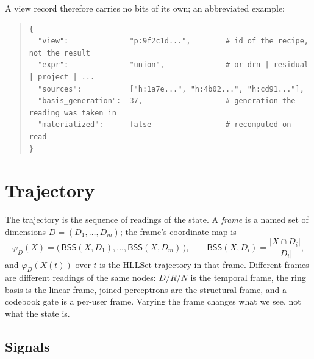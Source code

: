 \documentclass[11pt,a4paper]{article}
\theoremstyle{remark}
\newcommand{\BSS}{\ensuremath{\mathsf{BSS}}}          %
\begin{document}
A view record therefore carries no bits of its own; an abbreviated example:

\begin{quote}\small
\begin{verbatim}
{
  "view":              "p:9f2c1d...",        # id of the recipe, not the result
  "expr":              "union",              # or drn | residual | project | ...
  "sources":           ["h:1a7e...", "h:4b02...", "h:cd91..."],
  "basis_generation":  37,                   # generation the reading was taken in
  "materialized":      false                 # recomputed on read
}
\end{verbatim}
\end{quote}

\section{Trajectory}
\label{sec:trajectory}

The trajectory is the sequence of readings of the state. A \emph{frame} is a
named set of dimensions $D=(D_1,\dots,D_m)$; the frame's coordinate map is
\begin{equation}
\label{eq:frame}
\varphi_D(X) = \bigl(\,\BSS(X,D_1),\dots,\BSS(X,D_m)\,\bigr),
\qquad
\BSS(X,D_i) = \frac{|X\cap D_i|}{|D_i|},
\end{equation}
and $\varphi_D(X(t))$ over $t$ is the HLLSet trajectory in that frame. Different
frames are different readings of the same nodes: $D/R/N$ is the temporal frame,
the ring basis is the linear frame, joined perceptrons are the structural frame,
and a codebook gate is a per-user frame. Varying the frame changes what we see,
not what the state is.

\subsection{Signals}
\end{document}
